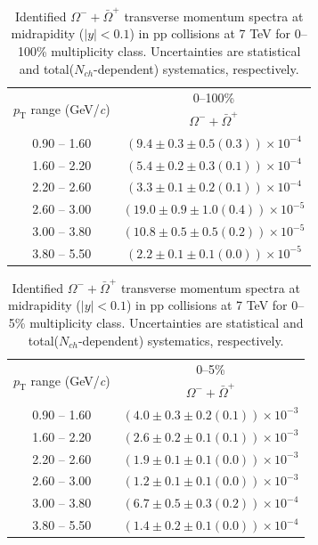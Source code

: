 \clearpage
\begin{table}
\caption{Identified $\Omega^{-} + \bar{\Omega}^{+}$ transverse momentum spectra at midrapidity ($|y|<0.1$) in pp collisions at 7 TeV for 0--100\% multiplicity class. Uncertainties are statistical and total($N_{ch}$-dependent) systematics, respectively.}
\label{tab:OmegaSum_0to100}
\begin{center}
\begin{tabular}{ c | c }
\hline
\multirow{2}{*}{$p_{\mathrm{T}}$ range (GeV/\textit{c})} & \multicolumn{1}{c}{0--100\%} \\ & $\Omega^{-} + \bar{\Omega}^{+}$\\ 
\hline
0.90 -- 1.60 & $(9.4\pm0.3\pm0.5(0.3))\times10^{-4}$ \\ 
1.60 -- 2.20 & $(5.4\pm0.2\pm0.3(0.1))\times10^{-4}$ \\ 
2.20 -- 2.60 & $(3.3\pm0.1\pm0.2(0.1))\times10^{-4}$ \\ 
2.60 -- 3.00 & $(19.0\pm0.9\pm1.0(0.4))\times10^{-5}$ \\ 
3.00 -- 3.80 & $(10.8\pm0.5\pm0.5(0.2))\times10^{-5}$ \\ 
3.80 -- 5.50 & $(2.2\pm0.1\pm0.1(0.0))\times10^{-5}$ \\ 
\hline
\end{tabular}
\end{center}
\end{table}
 
\begin{table}
\caption{Identified $\Omega^{-} + \bar{\Omega}^{+}$ transverse momentum spectra at midrapidity ($|y|<0.1$) in pp collisions at 7 TeV for 0--5\% multiplicity class. Uncertainties are statistical and total($N_{ch}$-dependent) systematics, respectively.}
\label{tab:OmegaSum_0to5}
\begin{center}
\begin{tabular}{ c | c }
\hline
\multirow{2}{*}{$p_{\mathrm{T}}$ range (GeV/\textit{c})} & \multicolumn{1}{c}{0--5\%} \\ & $\Omega^{-} + \bar{\Omega}^{+}$\\ 
\hline
0.90 -- 1.60 & $(4.0\pm0.3\pm0.2(0.1))\times10^{-3}$ \\ 
1.60 -- 2.20 & $(2.6\pm0.2\pm0.1(0.1))\times10^{-3}$ \\ 
2.20 -- 2.60 & $(1.9\pm0.1\pm0.1(0.0))\times10^{-3}$ \\ 
2.60 -- 3.00 & $(1.2\pm0.1\pm0.1(0.0))\times10^{-3}$ \\ 
3.00 -- 3.80 & $(6.7\pm0.5\pm0.3(0.2))\times10^{-4}$ \\ 
3.80 -- 5.50 & $(1.4\pm0.2\pm0.1(0.0))\times10^{-4}$ \\ 
\hline
\end{tabular}
\end{center}
\end{table}
 
